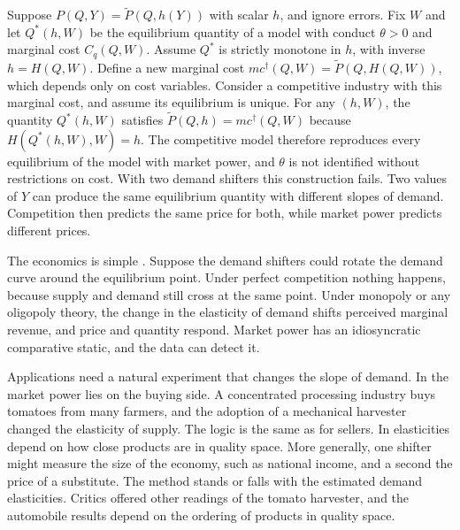 \begin{remark}\label{rem:01-lau}
Suppose $P(Q, Y) = \tilde P(Q, h(Y))$ with scalar $h$, and ignore errors. Fix $W$ and let $Q^*(h, W)$ be the
equilibrium quantity of a model with conduct $\theta > 0$ and marginal cost $C_q(Q, W)$. Assume $Q^*$ is strictly
monotone in $h$, with inverse $h = H(Q, W)$. Define a new marginal cost $mc^{\dagger}(Q, W) = \tilde P(Q, H(Q, W))$,
which depends only on cost variables. Consider a competitive industry with this marginal cost, and assume its
equilibrium is unique. For any $(h, W)$, the quantity $Q^*(h, W)$ satisfies $\tilde P(Q, h) = mc^{\dagger}(Q, W)$
because $H(Q^*(h, W), W) = h$. The competitive
model therefore reproduces every equilibrium of the model with market power, and $\theta$ is not identified without
restrictions on cost. With two demand shifters this construction fails. Two values of $Y$ can produce the same
equilibrium quantity with different slopes of demand. Competition then predicts the same price for both, while market
power predicts different prices.
\end{remark}

The economics is simple \citep[p.~1033]{Bresnahan1989}. Suppose the demand shifters could rotate the demand curve
around the equilibrium point. Under perfect competition nothing happens, because supply and demand still cross at the
same point. Under monopoly or any oligopoly theory, the change in the elasticity of demand shifts perceived marginal
revenue, and price and quantity respond. Market power has an idiosyncratic comparative static, and the data can detect
it.

Applications need a natural experiment that changes the slope of demand. In \citet{JustChern1980} the market power lies
on the buying side. A concentrated processing industry buys tomatoes from many farmers, and the adoption of a
mechanical harvester changed the elasticity of supply. The logic is the same as for sellers. In
\citet{Bresnahan1981,Bresnahan1987} elasticities depend on how close products are in quality space. More generally,
one shifter might measure the size of the economy, such as national income, and a second the price of a substitute.
The method stands or falls with the estimated demand elasticities. Critics offered other readings of the tomato
harvester, and the automobile results depend on the ordering of products in quality space.

